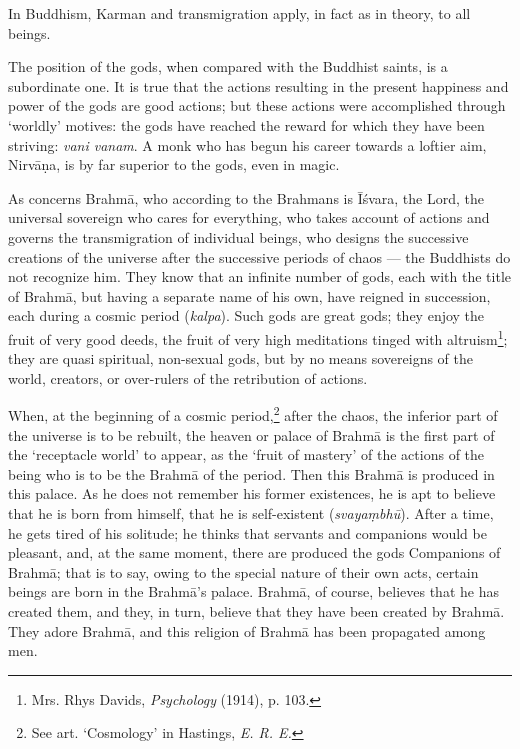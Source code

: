 \documentclass[a4paper, 11pt, oneside, english]{article}
\begin{document}
In Buddhism, Karman and transmigration apply, in fact as in theory, to all beings.

The position of the gods, when compared with the Buddhist saints, is a subordinate one. It is true that the actions resulting in the present happiness and power of the gods are good actions; but these actions were accomplished through `worldly' motives: the gods have reached the reward for which they have been striving: \emph{vani vanam}. A monk who has begun his career towards a loftier aim, Nirvāṇa, is by far superior to the gods, even in magic.

As concerns Brahmā, who according to the Brahmans is Īśvara, the Lord, the universal sovereign who cares for everything, who takes account of actions and governs the transmigration of individual beings, who designs the successive creations of the universe after the successive periods of chaos --- the Buddhists do not recognize him. They know that an infinite number of gods, each with the title of Brahmā, but having a separate name of his own, have reigned in succession, each during a cosmic period (\emph{kalpa}). Such gods are great gods; they enjoy the fruit of very good deeds, the fruit of very high meditations tinged with altruism\footnote{Mrs. Rhys Davids, \emph{Psychology} (1914), p. 103.}; they are quasi spiritual, non-sexual gods, but by no means sovereigns of the world, creators, or over-rulers of the retribution of actions.

When, at the beginning of a cosmic period,\footnote{See art. `Cosmology' in Hastings, \emph{E. R. E.}} after the chaos, the inferior part of the universe is to be rebuilt, the heaven or palace of Brahmā is the first part of the `receptacle world' to appear, as the `fruit of mastery' of the actions of the being who is to be the Brahmā of the period. Then this Brahmā is produced in this palace. As he does not remember his former existences, he is apt to believe that he is born from himself, that he is self-existent (\emph{svayaṃbhū}). After a time, he gets tired of his solitude; he thinks that servants and companions would be pleasant, and, at the same moment, there are produced the gods Companions of Brahmā; that is to say, owing to the special nature of their own acts, certain beings are born in the Brahmā's palace. Brahmā, of course, believes that he has created them, and they, in turn, believe that they have been created by Brahmā. They adore Brahmā, and this religion of Brahmā has been propagated among men.
\end{document}
